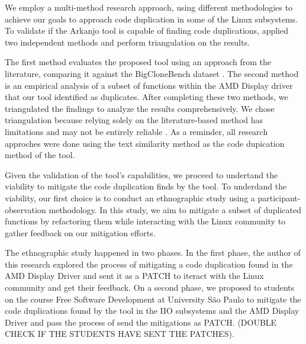 We employ a multi-method research approach, using different methodologies to achieve our goals
to approach code duplication in some of the Linux subsystems. 
To validate if the Arkanjo tool is capable of finding code duplications, 
applied two independent methods and perform triangulation on the results. 

The first method evaluates the proposed tool using an approach from the literature, 
comparing it against the BigCloneBench dataset \citep{bigclonebench}. 
The second method is an empirical analysis of a subset of functions within the 
AMD Display driver that our tool identified as duplicates. After completing these two 
methods, we triangulated the findings to analyze the results comprehensively. 
We chose triangulation because relying solely on the literature-based method has 
limitations and may not be entirely reliable \citep{bigfail, litreview}. As a reminder, 
all research approches were done using the text similarity method as the 
code dupication method of the tool.

Given the validation of the tool's capabilities, we proceed to undertand the viability 
to mitigate the code duplication finds by the tool. 
To underdand the viability, our first choice is to conduct an ethnographic study using 
a participant-observation methodology. 
In this study, we aim to mitigate a subset of duplicated functions by refactoring them 
while interacting with the Linux community to gather feedback on our mitigation efforts. 

The ethnographic study happened in two phases. 
In the first phase, the author of this research explored the process of mitigating
a code duplication found in the AMD Display Driver and sent it as a PATCH to iteract with the
Linux community and get their feedback. On a second phase, we proposed to students on the 
course Free Software Development at University São Paulo to mitigate the code duplications found 
by the tool in the IIO subsystems and the AMD Display Driver and pass the process of send the mitigations as PATCH.
(DOUBLE CHECK IF THE STUDENTS HAVE SENT THE PATCHES). 




